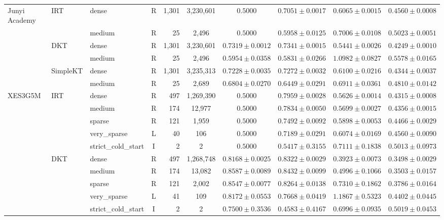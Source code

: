 \begin{table}[tbp]
{\begin{tabular}{lllcrccccc}
\midrule
Junyi Academy & IRT & dense & R & 1,301 & 3,230,601 & $0.5000$ & $0.7051 \pm 0.0017$ & $0.6065 \pm 0.0015$ & $0.4560 \pm 0.0008$ \\
 &  & medium & R & 25 & 2,496 & $0.5000$ & $0.5958 \pm 0.0125$ & $0.7006 \pm 0.0108$ & $0.5023 \pm 0.0051$ \\
 & DKT & dense & R & 1,301 & 3,230,601 & $0.7319 \pm 0.0012$ & $0.7341 \pm 0.0015$ & $0.5441 \pm 0.0026$ & $0.4249 \pm 0.0010$ \\
 &  & medium & R & 25 & 2,496 & $0.5954 \pm 0.0358$ & $0.5831 \pm 0.0266$ & $1.0982 \pm 0.0827$ & $0.5578 \pm 0.0165$ \\
 & SimpleKT & dense & R & 1,301 & 3,235,313 & $0.7228 \pm 0.0035$ & $0.7272 \pm 0.0032$ & $0.6100 \pm 0.0216$ & $0.4344 \pm 0.0037$ \\
 &  & medium & R & 25 & 2,689 & $0.6804 \pm 0.0270$ & $0.6449 \pm 0.0291$ & $0.6911 \pm 0.0361$ & $0.4810 \pm 0.0142$ \\
\midrule
XES3G5M & IRT & dense & R & 497 & 1,269,390 & $0.5000$ & $0.7959 \pm 0.0028$ & $0.5626 \pm 0.0014$ & $0.4315 \pm 0.0008$ \\
 &  & medium & R & 174 & 12,977 & $0.5000$ & $0.7834 \pm 0.0050$ & $0.5699 \pm 0.0027$ & $0.4356 \pm 0.0015$ \\
 &  & sparse & R & 121 & 1,959 & $0.5000$ & $0.7492 \pm 0.0092$ & $0.5898 \pm 0.0053$ & $0.4466 \pm 0.0029$ \\
 &  & very\_sparse & L & 40 & 106 & $0.5000$ & $0.7189 \pm 0.0291$ & $0.6074 \pm 0.0169$ & $0.4560 \pm 0.0090$ \\
 &  & strict\_cold\_start & I & 2 & 2 & $0.5000$ & $0.5417 \pm 0.3155$ & $0.7111 \pm 0.1838$ & $0.5013 \pm 0.0973$ \\
 & DKT & dense & R & 497 & 1,268,748 & $0.8168 \pm 0.0025$ & $0.8322 \pm 0.0029$ & $0.3923 \pm 0.0073$ & $0.3498 \pm 0.0029$ \\
 &  & medium & R & 174 & 13,082 & $0.8587 \pm 0.0089$ & $0.8432 \pm 0.0099$ & $0.4996 \pm 0.1066$ & $0.3503 \pm 0.0157$ \\
 &  & sparse & R & 121 & 2,002 & $0.8547 \pm 0.0077$ & $0.8264 \pm 0.0138$ & $0.7310 \pm 0.1862$ & $0.3786 \pm 0.0164$ \\
 &  & very\_sparse & L & 41 & 109 & $0.8172 \pm 0.0553$ & $0.7668 \pm 0.0419$ & $1.1867 \pm 0.5323$ & $0.4402 \pm 0.0445$ \\
 &  & strict\_cold\_start & I & 2 & 2 & $0.7500 \pm 0.3536$ & $0.4583 \pm 0.4167$ & $0.6996 \pm 0.0935$ & $0.5019 \pm 0.0453$ \\

\end{tabular}}
\end{table}
